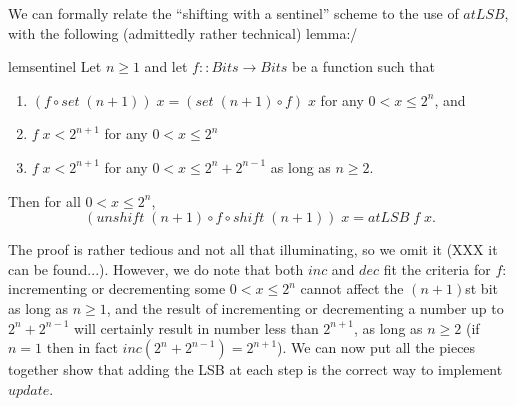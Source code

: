 \documentclass{jfp}
\newcommand{\Conid}[1]{\mathit{#1}}
\newcommand{\Varid}[1]{\mathit{#1}}
\renewcommand{\leq}{\leqslant}
\renewcommand{\geq}{\geqslant}
\theoremstyle{definition}
\theoremstyle{remark}
\begin{document}
We can formally relate the ``shifting with a sentinel'' scheme to
the use of \ensuremath{\Varid{atLSB}}, with the following (admittedly rather technical)
lemma:/

\begin{restatable}{lem}{sentinel} \label{lem:sentinel-scheme} Let $n \geq 1$ and let \ensuremath{\Varid{f}\mathbin{::}\Conid{Bits}\to \Conid{Bits}} be a function such that
  \begin{enumerate}
  \item \ensuremath{(\Varid{f}\mathbin{\circ}\Varid{set}\;(\Varid{n}\mathbin{+}\mathrm{1}))\;\Varid{x}\mathrel{=}(\Varid{set}\;(\Varid{n}\mathbin{+}\mathrm{1})\mathbin{\circ}\Varid{f})\;\Varid{x}} for any $0 < x \leq
    2^n$, and
  \item $\ensuremath{\Varid{f}\;\Varid{x}} < 2^{n+1}$ for any $0 < x \leq 2^n$
  \item $\ensuremath{\Varid{f}\;\Varid{x}} < 2^{n+1}$ for any $0 < x \leq 2^n + 2^{n-1}$ as long
    as $n \geq 2$.
  \end{enumerate}
  Then for all $0 < x \leq 2^n$,
  \[ \ensuremath{(\Varid{unshift}\;(\Varid{n}\mathbin{+}\mathrm{1})\mathbin{\circ}\Varid{f}\mathbin{\circ}\Varid{shift}\;(\Varid{n}\mathbin{+}\mathrm{1}))\;\Varid{x}\mathrel{=}\Varid{atLSB}\;\Varid{f}\;\Varid{x}}. \]
\end{restatable}

The proof is rather tedious and not all that illuminating, so we omit
it (XXX it can be found...).  However, we do note that both \ensuremath{\Varid{inc}} and
\ensuremath{\Varid{dec}} fit the criteria for \ensuremath{\Varid{f}}: incrementing or decrementing some
$0 < x \leq 2^n$ cannot affect the $(n+1)$st bit as long as
$n \geq 1$, and the result of incrementing or decrementing a number up
to $2^n + 2^{n-1}$ will certainly result in number less than
$2^{n+1}$, as long as $n \geq 2$ (if $n=1$ then in fact
$\ensuremath{\Varid{inc}} (2^n + 2^{n-1}) = 2^{n+1}$).  We can now put all the pieces
together show that adding the LSB at each step is the correct way to
implement \ensuremath{\Varid{update}}.
\end{document}
